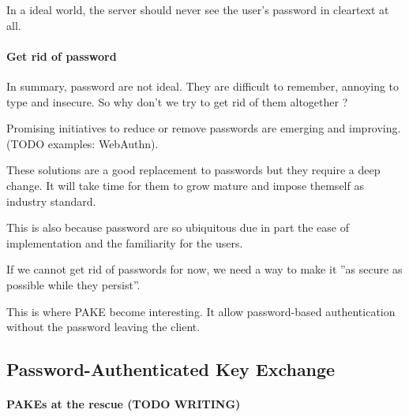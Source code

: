 \documentclass[../report.tex]{subfiles}
\begin{document}
In a ideal world, the server should never see the user's password in cleartext at all.


\paragraph{Get rid of password}

In summary, password are not ideal. They are difficult to remember, annoying to type and insecure.
So why don't we try to get rid of them altogether ?

Promising initiatives to reduce or remove passwords are emerging and improving. (TODO examples: WebAuthn).

These solutions are a good replacement to passwords but they require a deep change. It will take time for them to grow mature and impose themself as industry standard.

This is also because password are so ubiquitous due in part the ease of implementation and the familiarity for the users.

If we cannot get rid of passwords for now, we need a way to make it ''as secure as possible while they persist''.



This is where PAKE become interesting. It allow password-based authentication without the password leaving the client.




\subsection{Password-Authenticated Key Exchange}
\paragraph{PAKEs at the rescue (TODO WRITING)} %

% 


\end{document}
